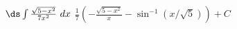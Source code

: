 {$\ds \int \frac{\sqrt{5-x^2}}{7x^2}\ dx$
}
{$\frac17\left(-\frac{\sqrt{5-x^2}}x-\sin^{-1}(x/\sqrt{5})\right)+C$
}
